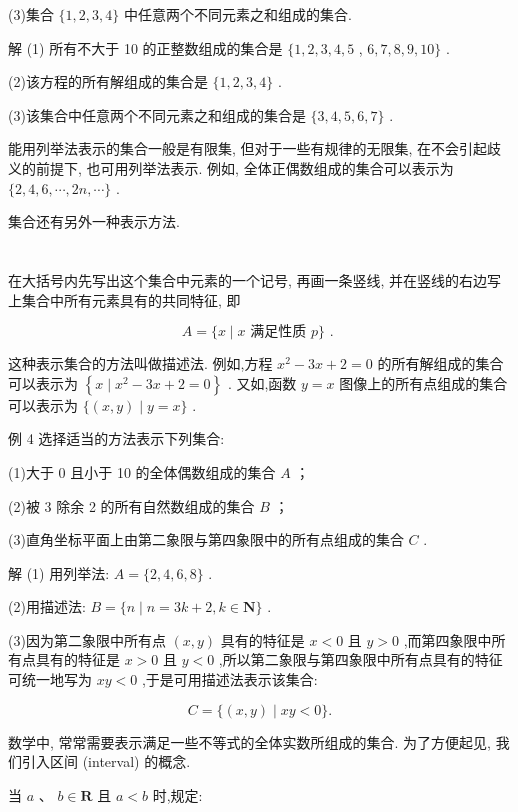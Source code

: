 \documentclass[10pt]{article}
\begin{document}
(3)集合 \(\{ 1,2,3,4\}\) 中任意两个不同元素之和组成的集合.

解 (1) 所有不大于 10 的正整数组成的集合是 \(\{ 1,2,3,4,5\) , \(6,7,8,9,{10}\}\) .

(2)该方程的所有解组成的集合是 \(\{ 1,2,3,4\}\) .

(3)该集合中任意两个不同元素之和组成的集合是 \(\{ 3,4,5,6,7\}\) .

能用列举法表示的集合一般是有限集, 但对于一些有规律的无限集, 在不会引起歧义的前提下, 也可用列举法表示. 例如, 全体正偶数组成的集合可以表示为 \(\{ 2,4,6,\cdots ,{2n},\cdots \}\) .

集合还有另外一种表示方法.

\section*{}

在大括号内先写出这个集合中元素的一个记号, 再画一条竖线, 并在竖线的右边写上集合中所有元素具有的共同特征, 即

\[
A = \{ x \mid  x\text{ 满足性质 }p\} \text{ . }
\]

这种表示集合的方法叫做描述法. 例如,方程 \({x}^{2} - {3x} + 2 = 0\) 的所有解组成的集合可以表示为 \(\left\{  {x \mid  {x}^{2} - {3x} + 2 = 0}\right\}\) . 又如,函数 \(y = x\) 图像上的所有点组成的集合可以表示为 \(\{ \left( {x,y}\right)  \mid  y = x\}\) .

例 4 选择适当的方法表示下列集合:

(1)大于 0 且小于 10 的全体偶数组成的集合 \(A\) ；

(2)被 3 除余 2 的所有自然数组成的集合 \(B\) ；

(3)直角坐标平面上由第二象限与第四象限中的所有点组成的集合 \(C\) .

解 (1) 用列举法: \(A = \{ 2,4,6,8\}\) .

(2)用描述法: \(B = \{ n \mid  n = {3k} + 2,k \in  \mathbf{N}\}\) .

(3)因为第二象限中所有点 \(\left( {x,y}\right)\) 具有的特征是 \(x < 0\) 且 \(y > 0\) ,而第四象限中所有点具有的特征是 \(x > 0\) 且 \(y < 0\) ,所以第二象限与第四象限中所有点具有的特征可统一地写为 \({xy} < 0\) ,于是可用描述法表示该集合:

\[
C = \{ \left( {x,y}\right)  \mid  {xy} < 0\} .
\]

数学中, 常常需要表示满足一些不等式的全体实数所组成的集合. 为了方便起见, 我们引入区间 (interval) 的概念.

当 \(a\text{ 、 }b \in  \mathbf{R}\) 且 \(a < b\) 时,规定:
\end{document}
